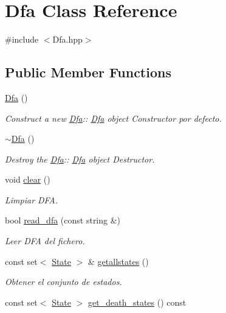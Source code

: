 \hypertarget{class_dfa}{}\section{Dfa Class Reference}
\label{class_dfa}


{\ttfamily \#include $<$Dfa.\+hpp$>$}

\subsection*{Public Member Functions}
\begin{DoxyCompactItemize}
\item 
\hyperlink{class_dfa_a8b4306c41ff0004264f56563e4399992}{Dfa} ()
\begin{DoxyCompactList}\small\item\em Construct a new \hyperlink{class_dfa}{Dfa}\+:\+: \hyperlink{class_dfa}{Dfa} object Constructor por defecto. \end{DoxyCompactList}\item 
\hyperlink{class_dfa_a2d110a2cc46b2dab6e6f9e901639b0cd}{$\sim$\+Dfa} ()
\begin{DoxyCompactList}\small\item\em Destroy the \hyperlink{class_dfa}{Dfa}\+:\+: \hyperlink{class_dfa}{Dfa} object Destructor. \end{DoxyCompactList}\item 
void \hyperlink{class_dfa_ae04b47677350573031c492799a1c897b}{clear} ()
\begin{DoxyCompactList}\small\item\em Limpiar D\+FA. \end{DoxyCompactList}\item 
bool \hyperlink{class_dfa_a54b373da1b88485641d0aa0e5fa303dd}{read\+\_\+dfa} (const string \&)
\begin{DoxyCompactList}\small\item\em Leer D\+FA del fichero. \end{DoxyCompactList}\item 
const set$<$ \hyperlink{class_state}{State} $>$ \& \hyperlink{class_dfa_a5f6b650f05ec3b8a5aa862c0f513c19e}{getallstates} ()
\begin{DoxyCompactList}\small\item\em Obtener el conjunto de estados. \end{DoxyCompactList}\item 
const set$<$ \hyperlink{class_state}{State} $>$ \hyperlink{class_dfa_a5e6cfb28034248d381e2fedb0df3d377}{get\+\_\+death\+\_\+states} () const

\end{DoxyCompactItemize}
